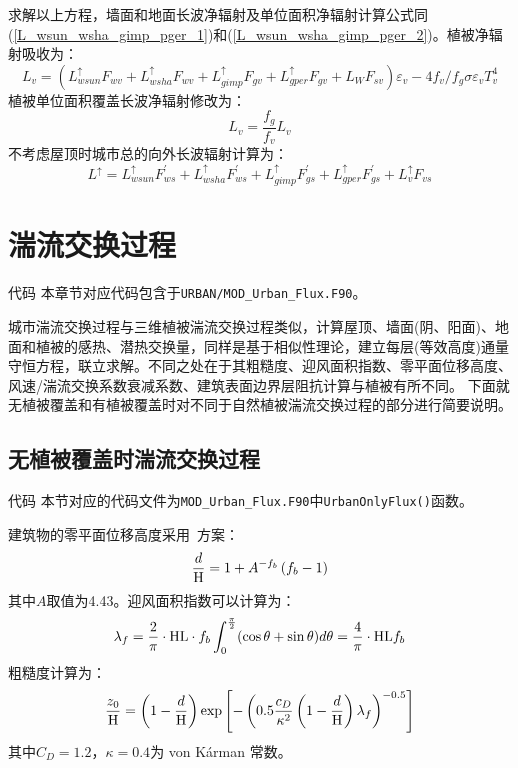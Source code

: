 求解以上方程，墙面和地面长波净辐射及单位面积净辐射计算公式同(\ref{L_wsun_wsha_gimp_pger_1})和(\ref{L_wsun_wsha_gimp_pger_2})。植被净辐射吸收为：
\begin{equation}
L_{v}=\left(L_{wsun}^{\uparrow} F_{wv}+L_{wsha}^{\uparrow} F_{wv}+L_{gimp}^{\uparrow} F_{gv}+L_{gper}^{\uparrow} F_{g v}+L_{W} F_{sv}\right) \varepsilon_{v}-4 f_{v} / f_{g} \sigma \varepsilon_{v} T_{v}^{4}
\end{equation}
植被单位面积覆盖长波净辐射修改为：
\begin{equation}
L_{v}=\frac{f_{g}}{f_{v}} L_{v}
\end{equation}
不考虑屋顶时城市总的向外长波辐射计算为：
\begin{equation}
L^{\uparrow}=L_{wsun}^{\uparrow} F_{ws}^{\prime}+L_{wsha}^{\uparrow} F_{ws}^{\prime}+L_{gimp}^{\uparrow} F_{gs}^{\prime}+L_{gper}^{\uparrow} F_{gs}^{\prime}+L_{v}^{\uparrow} F_{v s}
\end{equation}
\section{湍流交换过程}\label{城市湍流过程}
\begin{mymdframed}{代码}
本章节对应代码包含于\texttt{URBAN/MOD\_Urban\_Flux.F90}。
\end{mymdframed}

城市湍流交换过程与三维植被湍流交换过程类似，计算屋顶、墙面(阴、阳面)、地面和植被的感热、潜热交换量，同样是基于相似性理论，建立每层(等效高度)通量守恒方程，联立求解。不同之处在于其粗糙度、迎风面积指数、零平面位移高度、风速/湍流交换系数衰减系数、建筑表面边界层阻抗计算与植被有所不同。
下面就无植被覆盖和有植被覆盖时对不同于自然植被湍流交换过程的部分进行简要说明。

\subsection{无植被覆盖时湍流交换过程}\label{无植被覆盖时湍流交换过程}
\begin{mymdframed}{代码}
本节对应的代码文件为\texttt{MOD\_Urban\_Flux.F90}中\texttt{UrbanOnlyFlux()}函数。
\end{mymdframed}

建筑物的零平面位移高度采用~\citet{macdonald1998improved}方案：
\begin{equation}
\frac{d}{\rm H}=1+A^{-f_{b}}\left(f_{b}-1\right)
\end{equation}
其中$A$取值为4.43。迎风面积指数可以计算为：
\begin{equation}
\lambda_{f}=\frac{2}{\pi} \cdot {\rm HL} \cdot f_{b} \int_{0}^{\frac{\pi}{2}}(\cos \theta+\sin \theta) d \theta=\frac{4}{\pi} \cdot {\rm HL} f_{b}
\end{equation}
粗糙度计算为：
\begin{equation}
\frac{z_{0}}{\rm H}=\left(1-\frac{d}{\rm H}\right) \exp \left[-\left(0.5 \frac{c_{D}}{\kappa^{2}}\left(1-\frac{d}{\rm H}\right) \lambda_{f}\right)^{-0.5}\right]
\end{equation}
其中$C_D=1.2$，$\kappa=0.4$为 von K\'arman 常数。

